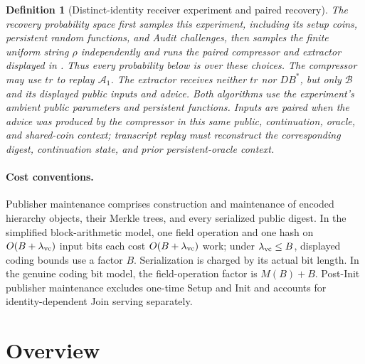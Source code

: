 \documentclass[11pt]{article}
\newtheorem{definition}[lemma]{Definition}
\begin{document}
\begin{definition}[Distinct-identity receiver experiment and paired recovery]
The recovery probability space first samples this experiment, including its
setup coins, persistent random functions, and Audit challenges, then samples
the finite uniform string $\rho$ independently and runs the paired compressor
and extractor displayed in .  Thus every probability below is
over these choices.  The compressor may use $\mathit{tr}$ to replay
$\mathcal A_1$.  The extractor receives neither $\mathit{tr}$ nor
$\mathit{DB}^{*}$, but only $\mathcal B$ and its displayed public inputs and
advice.  Both algorithms use the experiment's ambient public parameters and
persistent functions.  Inputs are \emph{paired} when the advice was produced
by the compressor in this same public, continuation, oracle, and shared-coin
context; transcript replay must reconstruct the corresponding digest,
continuation state, and prior persistent-oracle context.
\end{definition}

\paragraph{Cost conventions.}
Publisher maintenance comprises construction and maintenance of encoded
hierarchy objects, their Merkle trees, and every serialized public digest.  In the
simplified block-arithmetic model, one field operation and one hash on
$O(B+\lambda_{\rm vc})$ input bits each cost $O(B+\lambda_{\rm vc})$ work;
under $\lambda_{\rm vc}\le B$, displayed coding bounds use a factor $B$.
Serialization is charged by its actual bit length.  In the genuine coding
bit model, the field-operation factor is $M(B)+B$.  Post-Init publisher
maintenance excludes one-time Setup and Init and accounts for
identity-dependent Join serving separately.

\section{Overview}
\label{sec:overview}
\end{document}

